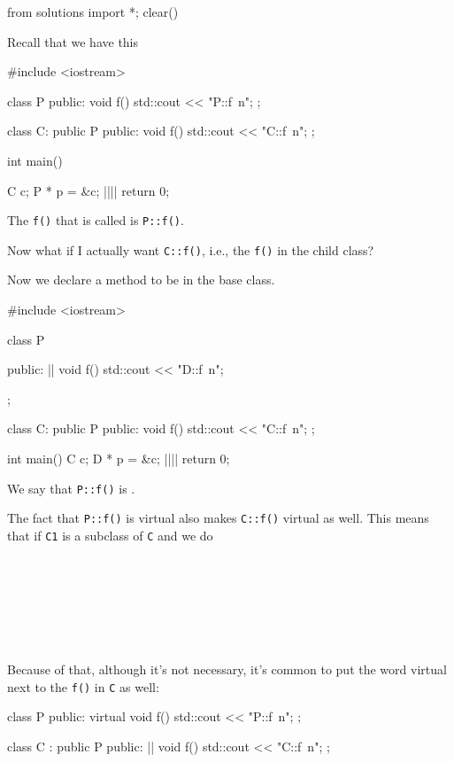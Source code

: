 \begin{python0}
from solutions import *; clear()
\end{python0}

Recall that we have this

\begin{consolethree}[escapeinside=||]
#include <iostream>

class P
{
public:
     void f()
     {    
          std::cout << "P::f\ n";
     }
};

class C: public P
{
public:
     void f()
     {    
          std::cout << "C::f\ n";
     }
};

int main()
{   
    C c;
    P * p = &c;
    ||||
    return 0;

}
\end{consolethree}

The \verb!f()! that is called is \verb!P::f()!.

Now what if I actually want \verb!C::f()!, i.e., the \verb!f()! in the child class?

Now we declare a method to be  in the base class.

\begin{consolethree}[escapeinside=||]
#include <iostream>

class P{
public:
     || void f() { std::cout << "D::f\ n"; }

};

class C: public P
{
public:
     void f() { std::cout << "C::f\ n"; }
};

int main()
{   
    C c;
    D * p = &c;
    ||||
    return 0;
}
\end{consolethree}

We say that \verb!P::f()! is .

The fact that \verb!P::f()! is virtual also makes \verb!C::f()! virtual as well. This means that if \verb!C1! is a subclass of \verb!C! and we do

\\
\\
\\
\\
\\
\\

Because of that, although it's not necessary, it's common to put the word virtual next to the \verb!f()! in \verb!C! as well:

\begin{consolethree}[escapeinside=||]
class P
{
public:
     virtual void f() { std::cout << "P::f\ n"; }
};

class C : public P
{
public:
     || void f() { std::cout << "C::f\ n"; }
}; 
\end{consolethree}

